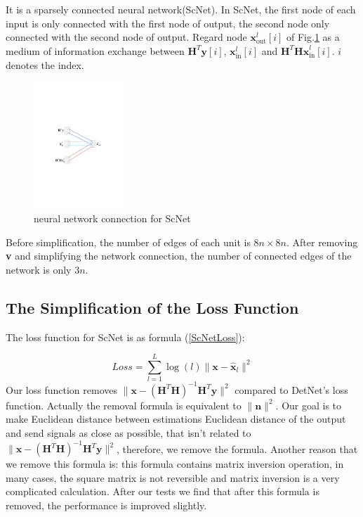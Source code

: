 \documentclass[conference]{IEEEtran}
\begin{document}
It is a sparsely connected neural network(ScNet). In ScNet, the first node of each input is only connected with the first node of output, the second node only connected with the second node of output. Regard node ${\textbf{x}_{\textrm{out}}^{l}[i]}$ of Fig.\ref{ScNet} as a medium of information exchange between ${\textbf{H}^T\textbf{y}[i]}$, ${\textbf{x}_{\textrm{in}}^l[i]}$ and ${\textbf{H}^T\textbf{Hx}_{\textrm{in}}^l[i]}$. $i$ denotes the index.

\begin{figure}[ht]
  \centering
  \includegraphics[width=0.3\textwidth]{ScNet.pdf}
  \caption{neural network connection for ScNet}
  \label{ScNet}
\end{figure}

Before simplification, the number of edges of each unit is ${8n \times 8n}$. After removing \textbf{v} and simplifying the network connection, the number of connected edges of the network is only ${3n}$.


\subsection{The Simplification of the Loss Function} The loss function for ScNet is as formula (\ref{ScNetLoss}):

\begin{equation}
\label{ScNetLoss}
Loss=\sum_{l=1}^L\log\left(l\right)\|\textbf{x}-\hat{\textbf{x}}_l\|^2
\end{equation}
Our loss function removes ${\|\textbf{x}-\left(\textbf{H}^T\textbf{H}\right)^{-1}\textbf{H}^T\textbf{y}\|^2}$ compared to DetNet's loss function. Actually the removal formula is equivalent to ${\|\textbf{n}\|^2}$. Our goal is to make Euclidean distance between estimations Euclidean distance of the output and send signals as close as possible, that isn't related to ${\|\textbf{x}-\left(\textbf{H}^T\textbf{H}\right)^{-1}\textbf{H}^T\textbf{y}\|^2}$, therefore, we remove the formula. Another reason that we remove this formula is: this formula contains matrix inversion operation, in many cases, the square matrix is not reversible and matrix inversion is a very complicated calculation. After our tests we find that after this formula is removed, the performance is improved slightly.
\end{document}
